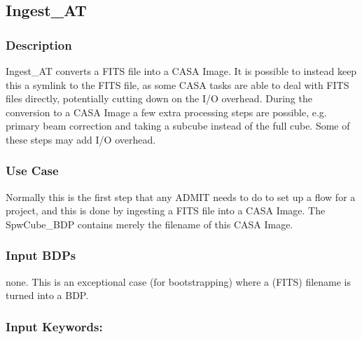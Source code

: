 
\subsection{Ingest\_AT}

\subsubsection{Description}

Ingest\_AT converts a FITS file into a CASA Image.
It is possible to instead keep this a
symlink to the FITS file, as some CASA tasks are able to deal with
FITS files directly, potentially cutting down on the I/O overhead.
During the conversion to a CASA Image a few extra processing
steps are possible, e.g.
primary beam correction and taking a subcube instead of the
full cube. Some of these steps may add I/O overhead.


\subsubsection{Use Case}


Normally this is the first step that any ADMIT needs to do
to set up a flow for a project, and this is done by ingesting
a FITS file into a CASA Image. The SpwCube\_BDP contains
merely the filename of this CASA Image.



\subsubsection{Input BDPs}

none. This is an exceptional case (for bootstrapping) where a (FITS) filename
is turned into a BDP.

\subsubsection{Input Keywords:}


